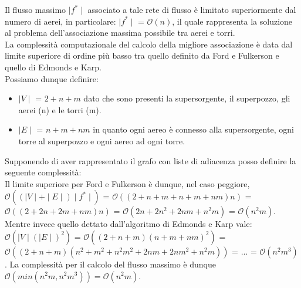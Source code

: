\documentclass[../cheatSheetAlgoritmi.tex]{subfiles}
\begin{document}
Il flusso massimo $\mid f^* \mid$ associato a tale rete di flusso è limitato superiormente dal numero di aerei, in particolare: $\mid f^* \mid$ = $\mathcal{O}(n)$, il quale rappresenta la soluzione al problema dell'associazione massima possibile tra aerei e torri. \\
La complessità computazionale del calcolo della migliore associazione è data dal limite superiore di ordine più basso tra quello definito da Ford e Fulkerson e quello di Edmonds e Karp. \\
Possiamo dunque definire: 
\begin{itemize}
    \item $\mid V \mid$ = $2 + n + m$ dato che sono presenti la supersorgente, il superpozzo, gli aerei (n) e le torri (m).
    \item $\mid E \mid$ = $n + m + nm$ in quanto ogni aereo è connesso alla supersorgente, ogni torre al superpozzo e ogni aereo ad ogni torre.
\end{itemize}
Supponendo di aver rappresentato il grafo con liste di adiacenza posso definire la seguente complessità: \\
Il limite superiore per Ford e Fulkerson è dunque, nel caso peggiore, $\mathcal{O}((\mid V \mid + \mid E \mid) \mid f^* \mid)$ = $\mathcal{O}((2 + n + m + n + m + nm) n)$ = $\mathcal{O}((2 + 2n + 2m + nm) n)$ = $\mathcal{O}(2n + 2n^2 + 2nm + n^2m)$ = $\mathcal{O}(n^2m)$. \\
Mentre invece quello dettato dall'algoritmo di Edmonds e Karp vale: $\mathcal{O}(\mid V \mid (\mid E \mid)^2)$ = $\mathcal{O}((2 + n + m)(n + m + nm)^2)$ = $\mathcal{O}((2 + n + m)(n^2 + m^2 + n^2m^2 + 2nm + 2nm^2 + n^2m))$ = ... = $\mathcal{O}(n^2m^3)$.
La complessità per il calcolo del flusso massimo è dunque $\mathcal{O}(min(n^2m, n^2m^3)) = \mathcal{O}(n^2m)$.
 
\end{document}
